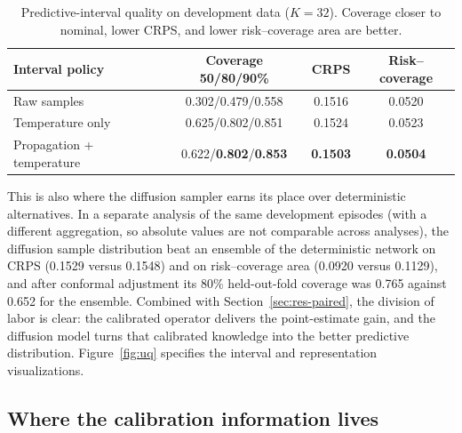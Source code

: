 \begin{table}[t]
\caption{Predictive-interval quality on development data ($K=32$). Coverage closer to nominal, lower CRPS, and lower risk--coverage area are better.}
\label{tab:intervals}
\centering
\small
\begin{tabular}{@{}lccc@{}}
\toprule
Interval policy & Coverage 50/80/90\% & CRPS & Risk--coverage \\
\midrule
Raw samples & 0.302/0.479/0.558 & 0.1516 & 0.0520 \\
Temperature only & 0.625/0.802/0.851 & 0.1524 & 0.0523 \\
Propagation + temperature & 0.622/\textbf{0.802}/\textbf{0.853} & \textbf{0.1503} & \textbf{0.0504} \\
\bottomrule
\end{tabular}
\end{table}

This is also where the diffusion sampler earns its place over deterministic alternatives. In a separate analysis of the same development episodes (with a different aggregation, so absolute values are not comparable across analyses), the diffusion sample distribution beat an ensemble of the deterministic network on CRPS (0.1529 versus 0.1548) and on risk--coverage area (0.0920 versus 0.1129), and after conformal adjustment its 80\% held-out-fold coverage was 0.765 against 0.652 for the ensemble. Combined with Section~\ref{sec:res-paired}, the division of labor is clear: the calibrated operator delivers the point-estimate gain, and the diffusion model turns that calibrated knowledge into the better predictive distribution. Figure~\ref{fig:uq} specifies the interval and representation visualizations.

\subsection{Where the calibration information lives}
\label{sec:res-representation}

